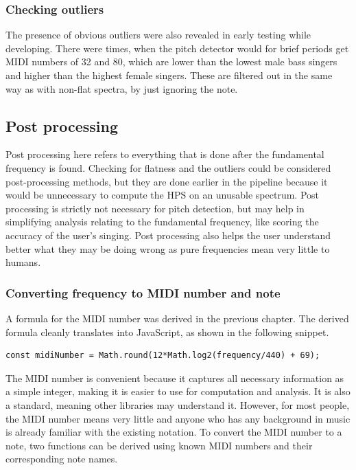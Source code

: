 \subsubsection{Checking outliers}
The presence of obvious outliers were also revealed in early testing while developing. There were times, when the pitch detector would for brief periods get MIDI numbers of 32 and 80, which are lower than the lowest male bass singers and higher than the highest female singers. These are filtered out in the same way as with non-flat spectra, by just ignoring the note. 

\subsection{Post processing}
Post processing here refers to everything that is done after the fundamental frequency is found. Checking for flatness and the outliers could be considered post-processing methods, but they are done earlier in the pipeline because it would be unnecessary to compute the HPS on an unusable spectrum. Post processing is strictly not necessary for pitch detection, but may help in simplifying analysis relating to the fundamental frequency, like scoring the accuracy of the user's singing. Post processing also helps the user understand better what they may be doing wrong as pure frequencies mean very little to humans. 

\subsubsection{Converting frequency to MIDI number and note}
A formula for the MIDI number was derived in the previous chapter. The derived formula cleanly translates into JavaScript, as shown in the following snippet.

\begin{lstlisting}[style=javascript]
    const midiNumber = Math.round(12*Math.log2(frequency/440) + 69);
\end{lstlisting}

The MIDI number is convenient because it captures all necessary information as a simple integer, making it is easier to use for computation and analysis. It is also a standard, meaning other libraries may understand it. However, for most people, the MIDI number means very little and anyone who has any background in music is already familiar with the existing notation. To convert the MIDI number to a note, two functions can be derived using known MIDI numbers and their corresponding note names. 

